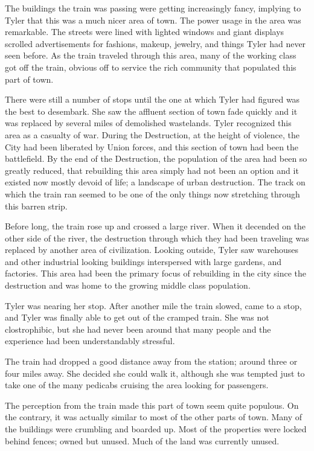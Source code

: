 \documentclass[courier]{sffms}
\begin{document}
The buildings the train was passing were getting increasingly
fancy, implying to Tyler that this was a much nicer area of town.
The power usage in the area was remarkable. The streets were
lined with lighted windows and giant displays scrolled
advertisements for fashions, makeup, jewelry, and things Tyler
had never seen before. As the train traveled through this
area, many of the working class got off the train, obvious
off to service the rich community that populated this part of
town.

There were still a number of stops until the one at which 
Tyler had
figured was the best to desembark. She saw the affluent
section of town fade quickly and it was replaced by several
miles of demolished wastelands. Tyler recognized this
area as a casualty of war. During the Destruction, at the
height of violence, the City had been liberated by Union
forces, and this section of town had been the battlefield.
By the end of the Destruction, the population of the area
had been so greatly reduced, that rebuilding this area
simply had not been an option and it existed now mostly
devoid of life; a landscape of urban destruction. The track
on which the train ran seemed to be one of the only
things now stretching through this barren strip.

Before long, the train rose up and crossed a large river.
When it decended on the other side of the river, the
destruction through which they had been traveling was
replaced by another area of civilization. Looking outside,
Tyler saw warehouses and other industrial looking buildings
interspersed with large gardens,
and factories. This area had been the primary focus of
rebuilding in the city since the destruction and was home
to the growing middle class population.

Tyler was nearing her stop. After another mile the train
slowed, came to a stop, and Tyler was finally able to get
out of the cramped train. She was not clostrophibic, but
she had never been around that many people and
the experience had been understandably stressful.

The train had dropped a good distance away from the
station; around three or four miles away. She decided
she could walk it, although she was tempted just to
take one of the many pedicabs cruising the area looking
for passengers.

The perception from the train made this part of town
seem quite populous. On the contrary, it was actually
similar to most of the other parts of town. Many of the
buildings were crumbling and boarded up. Most of
the properties were locked behind fences; owned but
unused. Much of the land was currently unused.
\end{document}
